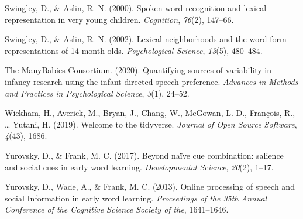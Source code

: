 \documentclass[10pt, letterpaper]{article}
\begin{document}
\leavevmode\hypertarget{ref-Swingley2000}{}%
Swingley, D., \& Aslin, R. N. (2000). Spoken word recognition and
lexical representation in very young children. \emph{Cognition},
\emph{76}(2), 147--66.

\leavevmode\hypertarget{ref-Swingley2002}{}%
Swingley, D., \& Aslin, R. N. (2002). Lexical neighborhoods and the
word-form representations of 14-month-olds. \emph{Psychological
Science}, \emph{13}(5), 480--484.

\leavevmode\hypertarget{ref-TheManyBabiesConsortium2020}{}%
The ManyBabies Consortium. (2020). Quantifying sources of variability in
infancy research using the infant-directed speech preference.
\emph{Advances in Methods and Practices in Psychological Science},
\emph{3}(1), 24--52.

\leavevmode\hypertarget{ref-Wickham2019}{}%
Wickham, H., Averick, M., Bryan, J., Chang, W., McGowan, L. D.,
François, R., \ldots{} Yutani, H. (2019). Welcome to the tidyverse.
\emph{Journal of Open Source Software}, \emph{4}(43), 1686.

\leavevmode\hypertarget{ref-Yurovsky2017}{}%
Yurovsky, D., \& Frank, M. C. (2017). Beyond naïve cue combination:
salience and social cues in early word learning. \emph{Developmental
Science}, \emph{20}(2), 1--17.

\leavevmode\hypertarget{ref-Yurovsky2013}{}%
Yurovsky, D., Wade, A., \& Frank, M. C. (2013). Online processing of
speech and social Information in early word learning. \emph{Proceedings
of the 35th Annual Conference of the Cognitive Science Society of the},
1641--1646.


\end{document}
